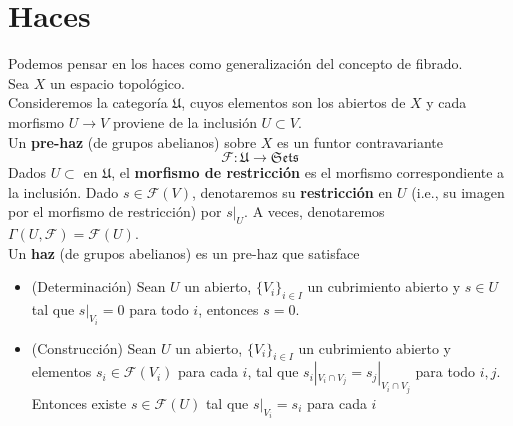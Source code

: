\documentclass[12pt]{book}
\begin{document}
%
%




\section{Haces}

Podemos pensar en los haces como generalización del concepto de fibrado.\\

Sea $X$ un espacio topológico.\\

Consideremos la categoría $\mathfrak{U}$, cuyos elementos son los abiertos de $X$ y cada morfismo $U\rightarrow V$ proviene de la inclusión $U \subset V$.\\
Un \textbf{pre-haz} (de grupos abelianos) sobre $X$ es un funtor contravariante $$ \mathcal{F}:\mathfrak{U} \rightarrow \mathfrak{Sets}$$
Dados $U \subset $ en $\mathfrak{U}$, el \textbf{morfismo de restricción} es el morfismo correspondiente a la inclusión. Dado $s \in \mathcal{F}(V)$, denotaremos su \textbf{restricción} en $U$ (i.e., su imagen por el morfismo de restricción) por $s|_U$. A veces, denotaremos $\Gamma(U, \mathcal{F})= \mathcal{F}(U)$.\\
Un \textbf{haz} (de grupos abelianos) es un pre-haz que satisface
\begin{itemize}
\item (Determinación) Sean $U$ un abierto, $\{V_i\}_{i\in I}$ un cubrimiento abierto y $s\in U$ tal que $s|_{V_i}=0$ para todo $i$, entonces $s=0$.
\item (Construcción) Sean $U$ un abierto, $\{V_i\}_{i\in I}$ un cubrimiento abierto y elementos $s_i \in \mathcal{F}(V_i)$ para cada $i$, tal que $s_i |_{V_i \cap V_j} = s_j |_{V_i \cap V_j}  $ para todo $i,j$. Entonces existe $s\in \mathcal{F}(U)$ tal que $ s|_{V_i} = s_i$ para cada $i$ 
\end{itemize}
\end{document}
